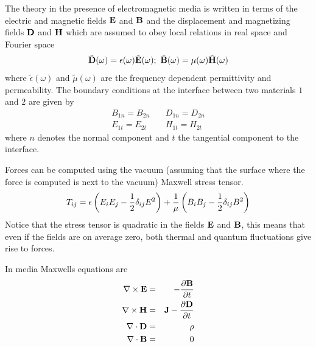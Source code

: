 The theory in the presence of electromagnetic media is written in terms of the electric and magnetic fields ${\bf E}$ and ${\bf B}$ and the displacement and magnetizing fields ${\bf D}$ and ${\bf H}$ which are assumed to obey local relations in real space and Fourier space
\begin{equation}
\tilde {\bf D}(\omega)=\epsilon(\omega)\tilde{\bf E}(\omega); \ \tilde {\bf B}(\omega)= \mu(\omega) \tilde{\bf H}(\omega)
\end{equation}
where $\tilde\epsilon( \omega)$ and $\tilde\mu( \omega)$ are the frequency dependent
permittivity and permeability. The boundary conditions at the interface between two materials $1$ and $2$ are given by
\begin{eqnarray}
B_{1n}= B_{2n} && \ D_{1n}=D_{2n} \\
E_{1t} = E_{2t} && \ H_{1t}=H_{2t}
\end{eqnarray}
where $n$ denotes the normal component and $t$ the tangential component to the interface.

Forces can be computed using the vacuum (assuming that the surface where the force is computed is next to the vacuum) Maxwell stress tensor.
\begin{equation}
T_{ij}= \epsilon\left(E_iE_j -{1\over 2}\delta_{ij}E^2\right) + {1\over \mu}\left( B_i B_j -{1\over 2}\delta_{ij}B^2\right)
\end{equation}
Notice that the stress tensor is quadratic in the fields ${\bf E}$ and ${\bf B}$, this means that even if the fields are on average zero, both thermal and quantum fluctuations give rise to forces.

In media Maxwells equations are
\begin{eqnarray}
\nabla \times{\bf E} &=& -{\partial {\bf B}\over \partial t} \\
\nabla \times{\bf H} &=& {\bf J}-{\partial {\bf D}\over \partial t} \\
\nabla \cdot {\bf D} &=& \rho\\
\nabla \cdot {\bf B} &=& 0 
\end{eqnarray}

